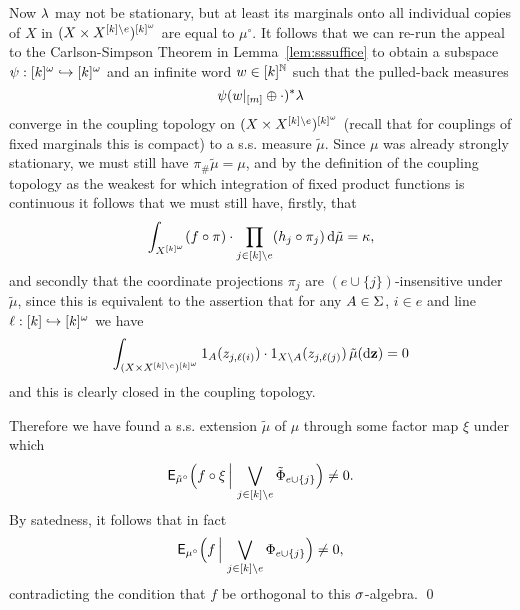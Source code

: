 \documentclass[11pt]{article}
\begin{document}
Now $\l$ may not be stationary, but at least its marginals onto all
individual copies of $X$ in $(X\times X^{[k]\setminus e})^{[k]^\o}$
are equal to $\mu^\circ$.  It follows that we can re-run the appeal
to the Carlson-Simpson Theorem in Lemma~\ref{lem:sssuffice} to
obtain a subspace $\psi:[k]^\o\into [k]^\o$ and an infinite word $w
\in [k]^\bbN$ such that the pulled-back measures
\[\psi(w|_{[m]}\oplus \cdot)^\ast\l\]
converge in the coupling topology on $(X\times X^{[k]\setminus
e})^{[k]^\o}$ (recall that for couplings of fixed marginals this is
compact) to a s.s. measure $\tilde{\mu}$. Since $\mu$ was already
strongly stationary, we must still have $\pi_\#\tilde{\mu}= \mu$,
and by the definition of the coupling topology as the weakest for
which integration of fixed product functions is continuous it
follows that we must still have, firstly, that
\[\int_{X^{[k]^\o}}(f\circ\pi)\cdot\prod_{j \in [k]\setminus e}(h_j\circ\pi_j)\,\d\tilde{\mu}  = \kappa,\]
and secondly that the coordinate projections $\pi_j$ are
$(e\cup\{j\})$-insensitive under $\tilde{\mu}$, since this is
equivalent to the assertion that for any $A \in \S$, $i \in e$ and
line $\ell:[k]\into [k]^\o$ we have
\[\int_{(X\times X^{[k]\setminus e})^{[k]^\o}} 1_A(z_{j,\ell(i)})\cdot 1_{X\setminus A}(z_{j,\ell(j)})\,\tilde{\mu}(\d\bf{z}) = 0\]
and this is clearly closed in the coupling topology.

Therefore we have found a s.s. extension $\tilde{\mu}$ of $\mu$
through some factor map $\xi$ under which
\[\sfE_{\tilde{\mu}^\circ}\Big(f\circ\xi\,\Big|\,\bigvee_{j\in [k]\setminus e}\tilde{\Phi}_{e\cup\{j\}}\Big)\neq 0.\]
By satedness, it follows that in fact
\[\sfE_{\mu^\circ}\Big(f\,\Big|\,\bigvee_{j\in [k]\setminus e}\Phi_{e\cup\{j\}}\Big)\neq 0,\]
contradicting the condition that $f$ be orthogonal to this
$\s$-algebra. \qed
\end{document}
